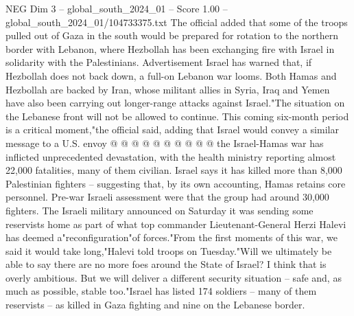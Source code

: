 \begin{textsample}{NEG Dim 3 – global\_south\_2024\_01 – Score 1.00 – global\_south\_2024\_01/104733375.txt}
The official added that some of the troops pulled out of Gaza in the south would be prepared for rotation to the northern border with Lebanon, where Hezbollah has been exchanging fire with Israel in solidarity with the Palestinians.
Advertisement Israel has warned that, if Hezbollah does not back down, a full-on Lebanon war looms.
Both Hamas and Hezbollah are backed by Iran, whose militant allies in Syria, Iraq and Yemen have also been carrying out longer-range attacks against Israel."The situation on the Lebanese front will not be allowed to continue.
This coming six-month period is a critical moment,"the official said, adding that Israel would convey a similar message to a U.S. envoy @ @ @ @ @ @ @ @ @ @ the Israel-Hamas war has inflicted unprecedented devastation, with the health ministry reporting almost 22,000 fatalities, many of them civilian.
Israel says it has killed more than 8,000 Palestinian fighters -- suggesting that, by its own accounting, Hamas retains core personnel.
Pre-war Israeli assessment were that the group had around 30,000 fighters.
The Israeli military announced on Saturday it was sending some reservists home as part of what top commander Lieutenant-General Herzi Halevi has deemed a"reconfiguration"of forces."From the first moments of this war, we said it would take long,"Halevi told troops on Tuesday."Will we ultimately be able to say there are no more foes around the State of Israel?
I think that is overly ambitious.
But we will deliver a different security situation -- safe and, as much as possible, stable too."Israel has listed 174 soldiers -- many of them reservists -- as killed in Gaza fighting and nine on the Lebanese border.

\end{textsample}
